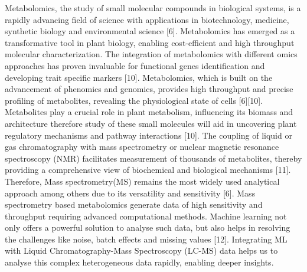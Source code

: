 \documentclass[12pt,a4paper]{report}
\begin{document}
Metabolomics, the study of small molecular compounds in biological systems, is a rapidly advancing field of science with applications in biotechnology, medicine, synthetic biology and environmental science [6]. Metabolomics has emerged as a transformative tool in plant biology, enabling cost-efficient and high throughput molecular characterization.
The integration of metabolomics with different omics approaches has proven invaluable for functional genes identification and developing trait specific markers [10]. Metabolomics, which is built on the advancement of phenomics and genomics, provides high throughput and precise profiling of metabolites, revealing the physiological state of cells [6][10].
Metabolites play a crucial role in plant metabolism, influencing its biomass and architecture therefore study of these small molecules will aid in uncovering plant regulatory mechanisms and pathway interactions [10].
The coupling of liquid or gas chromatography with mass spectrometry or nuclear magnetic resonance spectroscopy (NMR) facilitates measurement of thousands of metabolites, thereby providing a comprehensive view of biochemical and biological mechanisms [11]. Therefore, Mass spectrometry(MS) remains the most widely used analytical approach among others due to its versatility and sensitivity [6].
Mass spectrometry based metabolomics generate data of high sensitivity and throughput requiring advanced computational methods. Machine learning not only offers a powerful solution to analyse such data, but also helps in resolving the challenges like noise, batch effects and missing values [12]. Integrating ML with Liquid Chromatography-Mass Spectroscopy (LC-MS) data helps us to analyse this complex heterogeneous data rapidly, enabling deeper insights. \\
\end{document}

